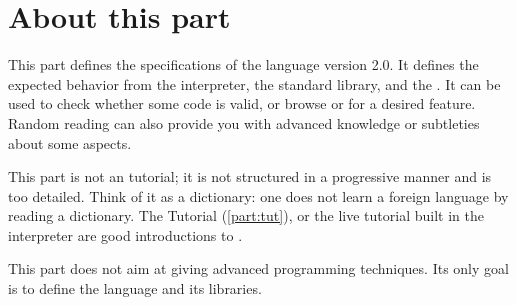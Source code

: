\chapter*{About this part}

This part defines the specifications of the \us language version
2.0. It defines the expected behavior from the \us interpreter, the
standard library, and the \sdk. It can be used to check whether some
code is valid, or browse \us or \Cxx \api for a desired
feature. Random reading can also provide you with advanced knowledge
or subtleties about some \us aspects.

This part is not an \us tutorial; it is not structured in a
progressive manner and is too detailed.  Think of it as a dictionary:
one does not learn a foreign language by reading a dictionary. The \us
Tutorial (\autoref{part:tut}), or the live \us tutorial built in the
interpreter are good introductions to \us.

This part does not aim at giving advanced programming techniques. Its
only goal is to define the language and its libraries.






